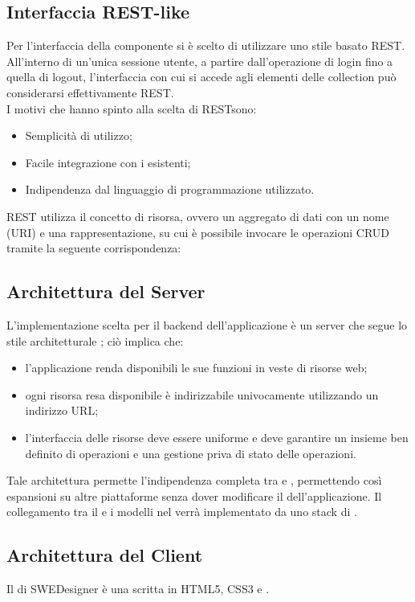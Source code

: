 	\subsection{Interfaccia REST-like}
	\label{3.3}
	Per l'interfaccia della componente  si è scelto di utilizzare uno stile basato REST. All'interno di un’unica sessione utente, a partire dall’operazione di login fino a quella di logout, l'interfaccia con cui si accede agli elementi delle collection può considerarsi effettivamente REST.\\
I motivi che hanno spinto alla scelta di RESTsono:
\begin{itemize}
\item Semplicità di utilizzo;
\item Facile integrazione con i  esistenti; 
\item Indipendenza dal linguaggio di programmazione utilizzato.
\end{itemize}	
REST utilizza il concetto di risorsa, ovvero un aggregato di dati con un nome (URI) e una rappresentazione, su cui è possibile invocare le operazioni CRUD tramite la seguente corrispondenza:
	\subsection{Architettura del Server}
	\label{3.4}
	L'implementazione scelta per il backend dell'applicazione è un server che segue lo stile architetturale ; ciò implica che:
	\begin{itemize}
	\item l'applicazione renda disponibili le sue funzioni in veste di risorse web;
	\item ogni risorsa resa disponibile è indirizzabile univocamente utilizzando un indirizzo URL;
	\item l'interfaccia delle risorse deve essere uniforme e deve garantire un insieme ben definito di operazioni e una gestione priva di stato delle operazioni.
	\end{itemize}

Tale architettura permette l'indipendenza completa tra  e , permettendo così espansioni su altre piattaforme senza dover modificare il  dell'applicazione.
Il collegamento tra il  e i modelli nel  verrà implementato da uno stack di .
	\subsection{Architettura del Client}
	\label{3.5}
	Il  di SWEDesigner è una  scritta in HTML5, CSS3 e .
